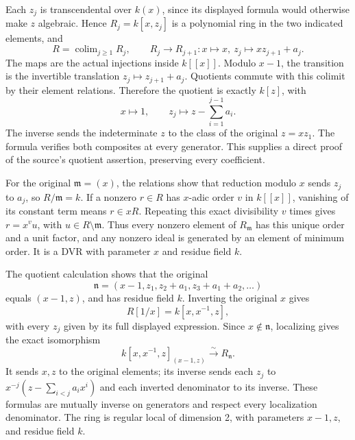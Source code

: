 Each \(z_j\) is transcendental over \(k(x)\), since its displayed formula would otherwise make \(z\) algebraic. Hence \(R_j=k[x,z_j]\) is a polynomial ring in the two indicated elements, and \[
 R=\operatorname{colim}_{j\ge1}R_j,\qquad
 R_j\to R_{j+1}:x\mapsto x,\ z_j\mapsto xz_{j+1}+a_j.
\] The maps are the actual injections inside \(k[[x]]\). Modulo \(x-1\), the transition is the invertible translation \(z_j\mapsto z_{j+1}+a_j\). Quotients commute with this colimit by their element relations. Therefore the quotient is exactly \(k[z]\), with \[
 x\mapsto1,\qquad z_j\mapsto z-\sum_{i=1}^{j-1}a_i.
\] The inverse sends the indeterminate \(z\) to the class of the original \(z=xz_1\). The formula verifies both composites at every generator. This supplies a direct proof of the source's quotient assertion, preserving every coefficient.

For the original \(\mathfrak m=(x)\), the relations show that reduction modulo \(x\) sends \(z_j\) to \(a_j\), so \(R/\mathfrak m=k\). If a nonzero \(r\in R\) has \(x\)-adic order \(v\) in \(k[[x]]\), vanishing of its constant term means \(r\in xR\). Repeating this exact divisibility \(v\) times gives \(r=x^vu\), with \(u\in R\setminus\mathfrak m\). Thus every nonzero element of \(R_{\mathfrak m}\) has this unique order and a unit factor, and any nonzero ideal is generated by an element of minimum order. It is a DVR with parameter \(x\) and residue field \(k\).

The quotient calculation shows that the original \[
 \mathfrak n=(x-1,z_1,z_2+a_1,z_3+a_1+a_2,\ldots)
\] equals \((x-1,z)\), and has residue field \(k\). Inverting the original \(x\) gives \[
 R[1/x]=k[x,x^{-1},z],
\] with every \(z_j\) given by its full displayed expression. Since \(x\notin\mathfrak n\), localizing gives the exact isomorphism \[
 k[x,x^{-1},z]_{(x-1,z)}\xrightarrow{\sim}R_{\mathfrak n}.
\] It sends \(x,z\) to the original elements; its inverse sends each \(z_j\) to \(x^{-j}(z-\sum_{i<j}a_ix^i)\) and each inverted denominator to its inverse. These formulas are mutually inverse on generators and respect every localization denominator. The ring is regular local of dimension 2, with parameters \(x-1,z\), and residue field \(k\).

